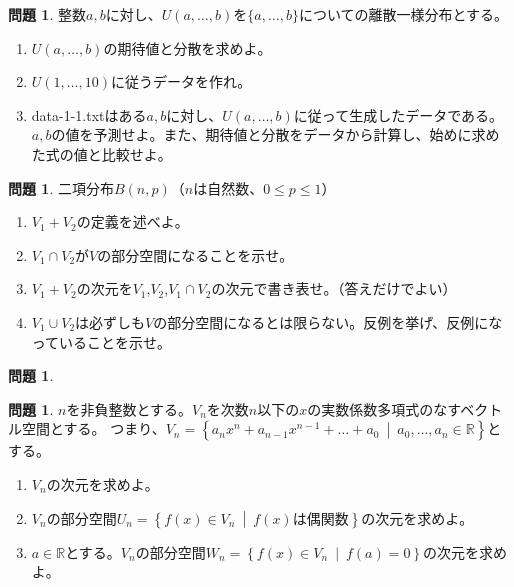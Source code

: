 \documentclass[uplatex]{jsarticle}
\theoremstyle{definition}
\numberwithin{equation}{section}
\newtheorem{prob}[section]{問題}
\newcommand{\midbar}{\ \middle| \ }
\newcommand{\R}{\mathbb{R}}
\begin{document}
\begin{prob}
  整数$a,b$に対し、$U(a,\dots,b)$を$\{a,\dots,b\}$についての離散一様分布とする。
  \begin{enumerate}
    \item $U(a,\dots,b)$の期待値と分散を求めよ。
    \item $U(1,\dots,10)$に従うデータを作れ。
    \item data-1-1.txtはある$a,b$に対し、$U(a,\dots,b)$に従って生成したデータである。$a,b$の値を予測せよ。また、期待値と分散をデータから計算し、始めに求めた式の値と比較せよ。
  \end{enumerate}
\end{prob}

\begin{prob}
  二項分布$B(n,p)$（$n$は自然数、$0\le p\le 1$）
  \begin{enumerate}
    \item $V_1+V_2$の定義を述べよ。
    \item $V_1\cap V_2$が$V$の部分空間になることを示せ。
    \item $V_1+V_2$の次元を$V_1$,$V_2$,$V_1\cap V_2$の次元で書き表せ。（答えだけでよい）
    \item $V_1\cup V_2$は必ずしも$V$の部分空間になるとは限らない。反例を挙げ、反例になっていることを示せ。
  \end{enumerate}
\end{prob}

\begin{prob}

\end{prob}

\begin{prob}
  $n$を非負整数とする。$V_n$を次数$n$以下の$x$の実数係数多項式のなすベクトル空間とする。
  つまり、$V_n=\left\{ a_nx^n+a_{n-1}x^{n-1}+\dots+ a_0\midbar a_0,\dots,a_n\in\R \right\}$とする。
  \begin{enumerate}
    \item $V_n$の次元を求めよ。
    \item $V_n$の部分空間$U_n=\left\{f(x)\in V_n\midbar f(x)\text{は偶関数}\right\}$の次元を求めよ。
    \item $a\in\R$とする。$V_n$の部分空間$W_n=\left\{f(x)\in V_n\midbar f(a)=0\right\}$の次元を求めよ。
  \end{enumerate}
\end{prob}
\end{document}
